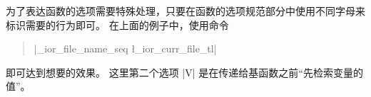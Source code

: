 \documentclass{l3doc}
\begin{document}
%
为了表达函数的选项需要特殊处理，只要在函数的选项规范部分中使用不同字母来标识需要的行为即可。
在上面的例子中，使用命令
\begin{quote}
     |\g_ior_file_name_seq \l_ior_curr_file_tl|
\end{quote}
即可达到想要的效果。
这里第二个选项 |V| 是在传递给基函数之前“先检索变量的值”。
\end{document}
